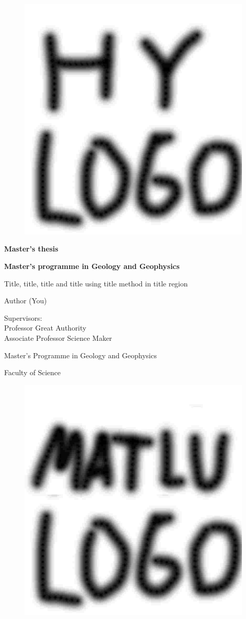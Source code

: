\documentclass[12pt]{article}%
\begin{document}
\frenchspacing
\begin{titlepage}
\begin{center}
\begin{figure}[h]
\centering
\vspace{1cm}
\includegraphics[width=0.25\linewidth]{hy.jpg}
\end{figure}
\vspace*{3cm}
\textbf{Master's thesis}\\
\bigskip

\textbf{Master's programme in Geology and Geophysics}\\
\vspace*{1cm}

Title, title, title and title using title method in title region

Author (You)

\the\year
\vspace*{2cm}

Supervisors:\\
Professor Great Authority\\
Associate Professor Science Maker\\
\vspace*{2cm}

Master’s Programme in Geology and Geophysics 

Faculty of Science
\end{center}
\end{titlepage}


\begin{figure}[h]
\vspace{-2cm}
\hspace{-3cm}
\includegraphics[width=0.4\linewidth]{matlu_logo}
\end{figure}
\end{document}
